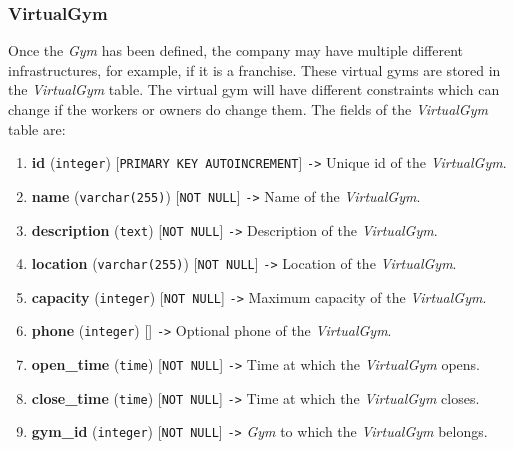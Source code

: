 \documentclass[a4paper, 12pt, oneside]{book}
\begin{document}
\subsubsection{VirtualGym}
Once the \emph{Gym} has been defined, the company may have multiple different infrastructures, for example, if it is a franchise. These virtual gyms are stored in the \emph{VirtualGym} table. The virtual gym will have different constraints which can change if the workers or owners do change them. The fields of the \emph{VirtualGym} table are:
\begin{enumerate}[label = -]
	\item \textbf{id} (\texttt{integer}) [\texttt{PRIMARY KEY AUTOINCREMENT}] \texttt{->} Unique id of the \emph{VirtualGym}.
	\item \textbf{name} (\texttt{varchar(255)}) [\texttt{NOT NULL}] \texttt{->} Name of the \emph{VirtualGym}.
	\item \textbf{description} (\texttt{text}) [\texttt{NOT NULL}] \texttt{->} Description of the \emph{VirtualGym}.
	\item \textbf{location} (\texttt{varchar(255)}) [\texttt{NOT NULL}] \texttt{->} Location of the \emph{VirtualGym}.
	\item \textbf{capacity} (\texttt{integer}) [\texttt{NOT NULL}] \texttt{->} Maximum capacity of the \emph{VirtualGym}.
	\item \textbf{phone} (\texttt{integer}) [] \texttt{->} Optional phone of the \emph{VirtualGym}.
	\item \textbf{open\_time} (\texttt{time}) [\texttt{NOT NULL}] \texttt{->} Time at which the \emph{VirtualGym} opens.
	\item \textbf{close\_time} (\texttt{time}) [\texttt{NOT NULL}] \texttt{->} Time at which the \emph{VirtualGym} closes.
	\item \textbf{gym\_id} (\texttt{integer}) [\texttt{NOT NULL}] \texttt{->} \emph{Gym} to which the \emph{VirtualGym} belongs.
\end{enumerate}
\end{document}
